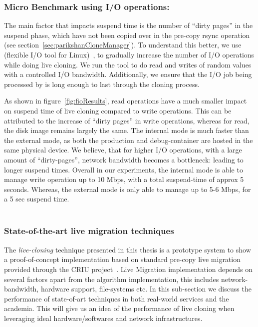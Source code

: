 \subsubsection{Micro Benchmark using I/O operations:}
The main factor that impacts suspend time is the number of ``dirty pages'' in the suspend phase, which have not been copied over in the pre-copy rsync operation (see section~\ref{sec:parikshanCloneManager}).
To understand this better, we use \fio (flexible I/O tool for Linux)~\cite{fio}, to gradually increase the number of I/O operations while doing live cloning.
We run the \fio tool to do read and writes of random values with a controlled I/O bandwidth. 
Additionally, we ensure that the I/O job being processed by \fio is long enough to last through the cloning process.

As shown in figure~\ref{fig:fioResults}, read operations have a much smaller impact on suspend time of live cloning compared to write operations.
This can be attributed to the increase of ``dirty pages'' in write operations, whereas for read, the disk image remains largely the same.
The internal mode is much faster than the external mode, as both the production and debug-container are hosted in the same physical device.
We believe, that for higher I/O operations, with a large amount of ``dirty-pages'', network bandwidth becomes a bottleneck: leading to longer suspend times.
Overall in our experiments, the internal mode is able to manage write operation up to 10 Mbps, with a total suspend-time of approx 5 seconds.
Whereas, the external mode is only able to manage up to 5-6 Mbps, for a 5 sec suspend time.\\ \\

\subsubsection{State-of-the-art live migration techniques}

The \emph{live-cloning} technique presented in this thesis is a prototype system to show a proof-of-concept implementation based on standard pre-copy live migration provided through the CRIU project~\cite{criulive}. Live Migration implementation depends on several factors apart from the algorithm implementation, this includes network-bandwidth, hardware support, file-systems etc. In this sub-section we discuss the performance of state-of-art techniques in both real-world services and the academia. This will give us an idea of the performance of live cloning when leveraging ideal hardware/softwares and network infrastructures.

